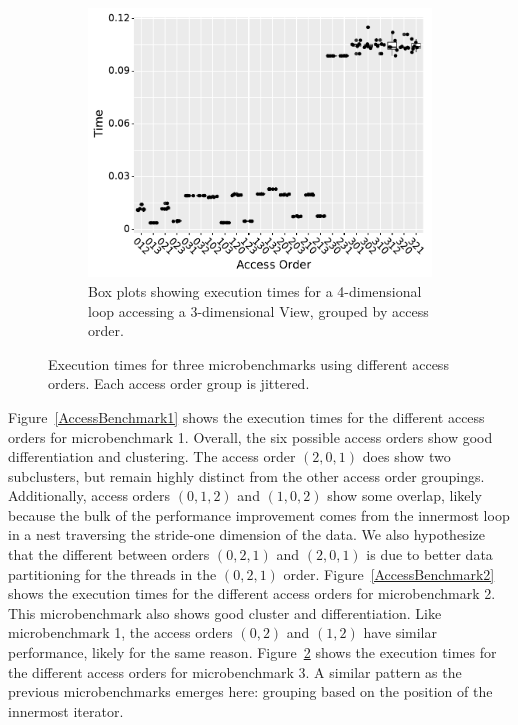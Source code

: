 \documentclass[sigconf,review=true]{acmart}
\begin{document}
\begin{figure}
\bigskip
\begin{subfigure}{0.48\textwidth}
	\includegraphics[width=\textwidth]{benchmark3_boxplot.pdf}
	\caption{Box plots showing execution times for a 4-dimensional loop accessing a 3-dimensional View, grouped by access order.}
	\label{AccessBenchmark3}
\end{subfigure}

\caption{Execution times for three microbenchmarks using different access orders. Each access order group is jittered.}
\end{figure}

Figure~\ref{AccessBenchmark1} shows the execution times for the different access orders for microbenchmark 1.
Overall, the six possible access orders show good differentiation and clustering.
The access order $(2,0,1)$ does show two subclusters, but remain highly distinct from the other access order groupings. 
Additionally, access orders $(0,1,2)$ and $(1,0,2)$ show some overlap, likely because the bulk of the performance improvement comes from the innermost loop in a nest traversing the stride-one dimension of the data.
We also hypothesize that the different between orders $(0,2,1)$ and $(2,0,1)$ is due to better data partitioning for the threads in the $(0,2,1)$ order. 
Figure~\ref{AccessBenchmark2} shows the execution times for the different access orders for microbenchmark 2. 
This microbenchmark also shows good cluster and differentiation.
Like microbenchmark 1, the access orders $(0,2)$ and $(1,2)$ have similar performance, likely for the same reason. 
Figure~\ref{AccessBenchmark3} shows the execution times for the different access orders for microbenchmark 3.
A similar pattern as the previous microbenchmarks emerges here: grouping based on the position of the innermost iterator. 
\end{document}
